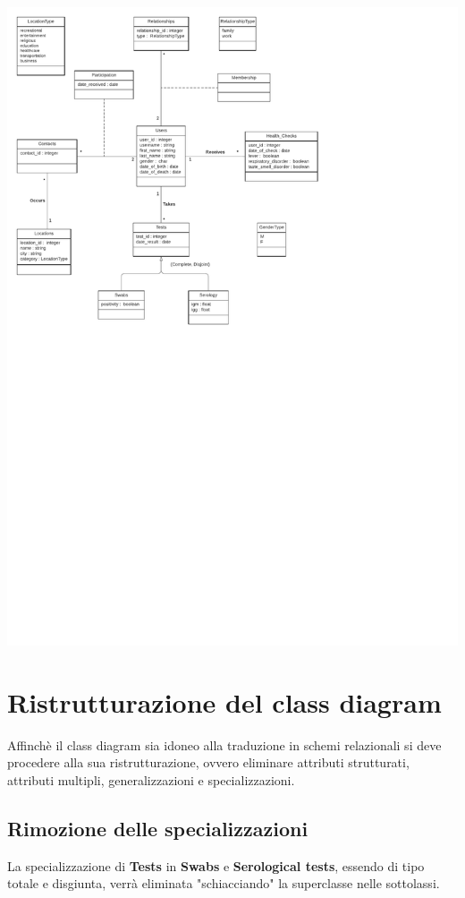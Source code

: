 \documentclass[a4paper]{book}
\begin{document}
       \includegraphics{ClassDiagram.pdf}
    
    \section{Ristrutturazione del class diagram}
    	Affinchè il class diagram sia idoneo alla traduzione in schemi relazionali si deve procedere alla sua ristrutturazione, ovvero eliminare attributi strutturati, attributi multipli, generalizzazioni e specializzazioni.
    	
    	\subsection{Rimozione delle specializzazioni}
    		La specializzazione di \textbf{Tests} in \textbf{Swabs} e \textbf{Serological tests}, essendo di tipo totale e disgiunta, verrà eliminata "schiacciando" la superclasse nelle sottolassi.
    		
\end{document}
